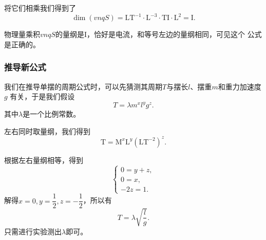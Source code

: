将它们相乘我们得到了
\[
    \dim (vnqS) = \mathrm{LT^{-1}\cdot L^{-3}\cdot TI\cdot L^2 = I }
.\] 

物理量乘积$vnqS$的量纲是$\mathrm{I}$，恰好是电流，和等号左边的量纲相同，可见这个
公式是正确的。

\subsubsection{推导新公式}

我们在推导单摆的周期公式时，可以先猜测其周期$T$与摆长$l$、摆重$m$和重力加速度$g$
有关，于是我们假设
\[
    T = \lambda m^{x}l^{y}g^{z}   
.\]
其中$\lambda $是一个比例常数。

左右同时取量纲，我们得到
\[
    \mathrm{T} = \mathrm{M}^{x}\mathrm{L}^{y}\left( \mathrm{LT}^{-2} \right)^{z} 
.\] 

根据左右量纲相等，得到
\[
    \begin{cases}
        0=y+z,\\
        0=x,\\
        -2z=1.
    \end{cases}
\] 
解得$x=0,y=\dfrac{1}{2},z=-\dfrac{1}{2}$，所以有
\[
    T = \lambda \sqrt{\frac{l}{g}} 
.\] 
只需进行实验测出$\lambda$即可。
